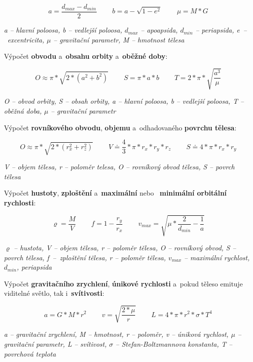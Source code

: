 \documentclass[a4paper,12pt]{article}
\begin{document}
\vspace*{-0.5cm}
$$a = \frac{d_{max} - d_{min}}{2}~~~~~~~~~~b = a - \sqrt{1 - e^2}~~~~~~~~~~\mu = M * G$$
\begin{center}
\textit{a -- hlavní poloosa, b -- vedlejší poloosa, $d_{max}$ -- apoapsida, $d_{min}$ -- periapsida, e~--~excentricita, $\mu$ -- gravitační parametr, M -- hmotnost tělesa}
\end{center}

Výpočet \textbf{obvodu} a~\textbf{obsahu orbity} a~\textbf{oběžné doby}:

\vspace*{-0.5cm}
$$O \approx \pi * \sqrt{2 * (a^2 + b^2)}~~~~~~~~~~S = \pi * a * b~~~~~~~~~~T = 2 * \pi * \sqrt{\frac{a^3}{\mu}}$$
\begin{center}
\textit{O -- obvod orbity, S -- obsah orbity, a -- hlavní poloosa, b -- vedlejší poloosa, T -- oběžná doba, $\mu$ -- gravitační parametr}
\end{center}

Výpočet \textbf{rovníkového obvodu}, \textbf{objemu} a~odhadovaného \textbf{povrchu tělesa}:

\vspace*{-0.5cm}
$$O \approx \pi * \sqrt{2 * (r_{x}^2 + r_{z}^2)}~~~~~~~~~~V \doteq \frac{4}{3} * \pi * r_{x} * r_{y} * r_{z}~~~~~~~~~~S \doteq 4 * \pi * r_{x} * r_{y}$$
\begin{center}
\textit{V -- objem tělesa, r -- poloměr telesa, O -- rovníkový obvod tělesa, S -- povrch tělesa}
\end{center}

Výpočet \textbf{hustoty}, \textbf{zploštění} a~\textbf{maximální} nebo ~\textbf{minimální orbitální rychlosti}:

\vspace*{-0.5cm}
$$\varrho = \frac{M}{V}~~~~~~~~~~f = 1 - \frac{r_{y}}{r_{x}}~~~~~~~~~~v_{max} = \sqrt{\mu * \frac{2}{d_{min}} - \frac{1}{a}}$$
\begin{center}
\textit{$\varrho$ -- hustota, V -- objem tělesa, r -- poloměr tělesa, O -- rovníkový obvod, S -- povrch tělesa, f~--~zploštění tělesa, r -- poloměr tělesa, $v_{max}$ -- maximální rychlost, $d_{min}$, periapsida}
\end{center}

Výpočet \textbf{gravitačního zrychlení}, \textbf{únikové rychlosti} a~pokud těleso emituje viditelné světlo, tak i~\textbf{svítivosti}:

\vspace*{-0.5cm}
$$a = G * M * r^2~~~~~~~~~~v = \sqrt{\frac{2 * \mu}{r}}~~~~~~~~~~L = 4 * \pi * r^2 * \sigma * T^4$$
\begin{center}
\textit{a -- gravitační zrychlení, M -- hmotnost, r -- poloměr, v -- úniková rychlost, $\mu$ -- gravitační parametr, L -- svítivost, $\sigma$ -- Stefan-Boltzmannova konstanta, T -- povrchová teplota}
\end{center}
\end{document}
